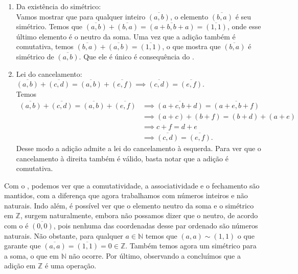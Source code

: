 \documentclass[../main.tex]{subfiles}
\begin{document}
\begin{dem}
\begin{enumerate}[label=(\roman*)]
        \item Da existência do simétrico: \\
        Vamos mostrar que para qualquer inteiro $\overline{(a,b)}$, o elemento $\overline{(b,a)}$ é seu simétrico. 
        Temos que $\overline{(a,b)}+ \overline{(b,a)} = \overline{(a+b,b+a)} = \overline{(1,1)}$, onde esse último elemento é o neutro da soma. Uma vez que a adição também é comutativa, temos $ \overline{(b,a)} + \overline{(a,b)} = \overline{(1,1)}$, o que mostra que $\overline{(b,a)}$ é simétrico de $\overline{(a,b)}$. Que ele é único é consequência do .
       
        \item Lei do cancelamento: $\overline{(a,b)} + \overline{(c,d)} = \overline{(a,b)} + \overline{(e,f)} \implies \overline{(c,d)} = \overline{(e,f)}$. \\
        Temos 
        \begin{align*}
            \overline{(a,b)} + \overline{(c,d)} = \overline{(a,b)} + \overline{(e,f)} 
            &\implies \overline{(a+c,b+d)} = \overline{(a+e,b+f)} \\ 
            &\implies (a+c)+(b+f)=(b+d)+(a+e) \\
            &\implies c+f = d+e \\ 
            &\implies \overline{(c,d)} = \overline{(e,f)}.
        \end{align*}
        Desse modo a adição admite a lei do cancelamento à esquerda. Para ver que o cancelamento à direita também é válido, basta notar que a adição é comutativa.
    \end{enumerate}
\end{dem}



Com o , podemos ver que a comutatividade, a associatividade e o fechamento são mantidos, com a diferença que agora trabalhamos com números inteiros e não naturais. Indo além, é possível ver que o elemento neutro da soma e o simétrico em $\mathbb{Z}$, surgem naturalmente, embora não possamos dizer que o neutro, de acordo com o  é $\overline{(0,0)}$, pois nenhuma das coordenadas desse par ordenado são números naturais. Não obstante, para qualquer $a \in \mathbb{N}$ temos que $(a,a) \sim (1,1)$ o que garante que $\overline{(a,a)} =\overline{(1,1)} = 0 \in \mathbb{Z}$. Também temos agora um simétrico para a soma, o que em $\mathbb{N}$ não ocorre. Por último, observando a  concluímos que a adição em $\mathbb{Z}$ é uma operação.
\end{document}
